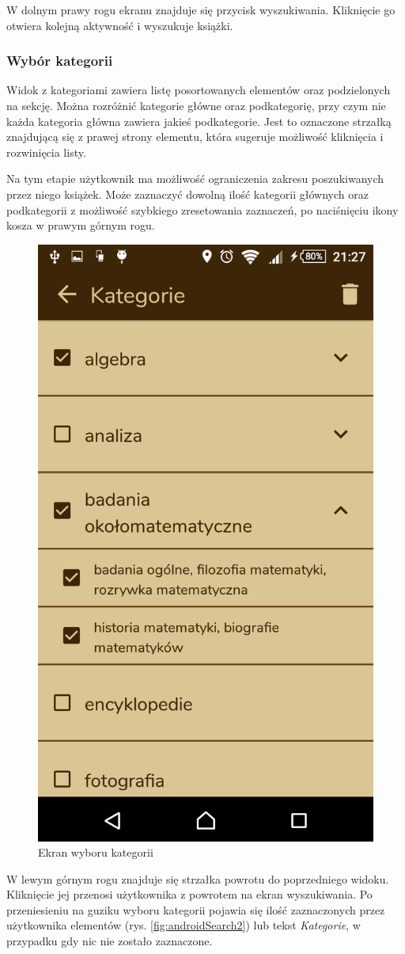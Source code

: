 \documentclass[twoside]{projektInzynierskiMS}
\begin{document}
W dolnym prawy rogu ekranu znajduje się przycisk wyszukiwania. Kliknięcie go otwiera kolejną aktywność i wyszukuje książki.

\subsubsection{Wybór kategorii}

Widok z kategoriami zawiera listę posortowanych elementów oraz podzielonych na sekcję. Można rozróżnić kategorie główne oraz podkategorię, przy czym nie każda kategoria główna zawiera jakieś podkategorie. Jest to oznaczone strzałką znajdującą się z prawej strony elementu, która sugeruje możliwość kliknięcia i rozwinięcia listy. 

Na tym etapie użytkownik ma możliwość ograniczenia zakresu poszukiwanych przez niego książek. Może zaznaczyć dowolną ilość kategorii głównych oraz podkategorii z możliwość szybkiego zresetowania zaznaczeń, po naciśnięciu ikony kosza w prawym górnym rogu. 

\begin{figure}[h]
  \centering
  \includegraphics[width=0.4\linewidth]{img/android/android4.PNG}
  \caption{Ekran wyboru kategorii}
  \label{fig:androidCategoriesScreen}
\end{figure}

W lewym górnym rogu znajduje się strzałka powrotu do poprzedniego widoku. Kliknięcie jej przenosi użytkownika z powrotem na ekran wyszukiwania. Po przeniesieniu na guziku wyboru kategorii pojawia się ilość zaznaczonych przez użytkownika elementów (rys. \ref{fig:androidSearch2}) lub tekst \textit{Kategorie}, w przypadku gdy nic nie zostało zaznaczone.
\end{document}

